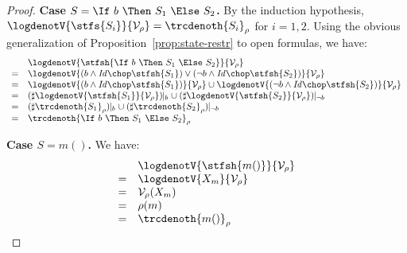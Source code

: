 \documentclass[a4paper,numberwithinsect]{lipics-v2021}
\begin{document}
\begin{proof}
\noindent\textbf{Case $S = \If\ b\ \Then\ S_1\ \Else\ S_2$.}
By the induction hypothesis,
$\logdenotV{\stfs{S_i}}{\mathcal{V}_\rho} = \trcdenoth{S_i}_\rho$ for $i=1,2$.
%
Using the obvious generalization of Proposition~\ref{prop:state-restr}
to open formulas, we have:  %
%
\[
\begin{array}{cl}
    & \logdenotV{\stfsh{\If\ b\ \Then\ S_1\ \Else\ S_2}}{\mathcal{V}_\rho} \\
  = & \logdenotV{(b \land \mathit{Id} \chop \stfsh{S_1})
              \lor
              (\lnot b \land \mathit{Id} \chop \stfsh{S_2})}{\mathcal{V}_\rho} \\
  = & \logdenotV{(b \land \mathit{Id} \chop \stfsh{S_1})}{\mathcal{V}_\rho}
      \cup
      \logdenotV{(\lnot b \land \mathit{Id} \chop \stfsh{S_2})}{\mathcal{V}_\rho} \\
  = & (\sharp \logdenotV{\stfsh{S_1}}{\mathcal{V}_\rho}) \!\!\mid_b 
      \cup\>
      (\sharp \logdenotV{\stfsh{S_2}}{\mathcal{V}_\rho}) \!\!\mid_{\neg b}  \\
  = & (\sharp \trcdenoth{S_1}_\rho) \!\!\mid_b 
      \cup\>
      (\sharp \trcdenoth{S_2}_\rho) \!\!\mid_{\neg b}  \\
  = & \trcdenoth{\If\ b\ \Then\ S_1\ \Else\ S_2}_\rho  
\end{array}
\]

\noindent\textbf{Case $S = m()$.}
%
We have:
%
\[
\begin{array}{cl}
    & \logdenotV{\stfsh{m()}}{\mathcal{V}_\rho} \\
  = & \logdenotV{X_m}{\mathcal{V}_\rho}  \\
  = & \mathcal{V}_\rho (X_m)  \\
  = & \rho (m)  \\
  = & \trcdenoth{m()}_\rho  
\end{array}
\]
\end{proof}
\end{document}
